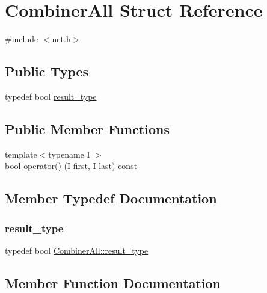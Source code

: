 \hypertarget{struct_combiner_all}{}\section{Combiner\+All Struct Reference}
\label{struct_combiner_all}


{\ttfamily \#include $<$net.\+h$>$}

\subsection*{Public Types}
\begin{DoxyCompactItemize}
\item 
typedef bool \mbox{\hyperlink{struct_combiner_all_ae9075371bfb6f2b47eee3bb86eded765}{result\+\_\+type}}
\end{DoxyCompactItemize}
\subsection*{Public Member Functions}
\begin{DoxyCompactItemize}
\item 
{\footnotesize template$<$typename I $>$ }\\bool \mbox{\hyperlink{struct_combiner_all_a5e00e6e750c3c080fef5c697a0bca1a0}{operator()}} (I first, I last) const
\end{DoxyCompactItemize}


\subsection{Member Typedef Documentation}
\mbox{\label{struct_combiner_all_ae9075371bfb6f2b47eee3bb86eded765}} 
\subsubsection{\texorpdfstring{result\+\_\+type}{result\_type}}
{\footnotesize\ttfamily typedef bool \mbox{\hyperlink{struct_combiner_all_ae9075371bfb6f2b47eee3bb86eded765}{Combiner\+All\+::result\+\_\+type}}}



\subsection{Member Function Documentation}
\mbox{\label{struct_combiner_all_a5e00e6e750c3c080fef5c697a0bca1a0}} 
